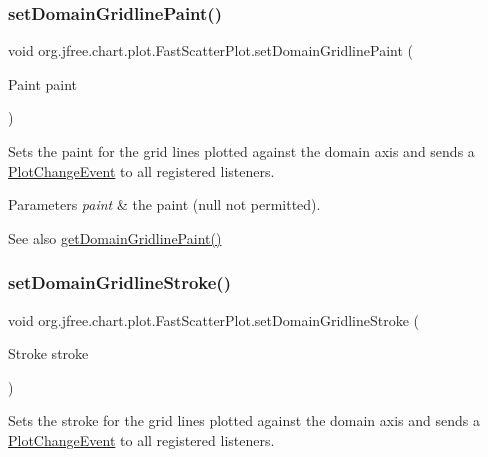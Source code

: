 \subsubsection{\texorpdfstring{set\+Domain\+Gridline\+Paint()}{setDomainGridlinePaint()}}
{\footnotesize\ttfamily void org.\+jfree.\+chart.\+plot.\+Fast\+Scatter\+Plot.\+set\+Domain\+Gridline\+Paint (\begin{DoxyParamCaption}\item[{Paint}]{paint }\end{DoxyParamCaption})}

Sets the paint for the grid lines plotted against the domain axis and sends a \mbox{\hyperlink{}{Plot\+Change\+Event}} to all registered listeners.


\begin{DoxyParams}{Parameters}
{\em paint} & the paint ({\ttfamily null} not permitted).\\
\hline
\end{DoxyParams}
\begin{DoxySeeAlso}{See also}
\mbox{\hyperlink{classorg_1_1jfree_1_1chart_1_1plot_1_1_fast_scatter_plot_a7b1602a024385bab17b05b27b0f55cda}{get\+Domain\+Gridline\+Paint()}} 
\end{DoxySeeAlso}
\mbox{\label{classorg_1_1jfree_1_1chart_1_1plot_1_1_fast_scatter_plot_afdbb5ad6859e7e0319b781713845e104}} 
\subsubsection{\texorpdfstring{set\+Domain\+Gridline\+Stroke()}{setDomainGridlineStroke()}}
{\footnotesize\ttfamily void org.\+jfree.\+chart.\+plot.\+Fast\+Scatter\+Plot.\+set\+Domain\+Gridline\+Stroke (\begin{DoxyParamCaption}\item[{Stroke}]{stroke }\end{DoxyParamCaption})}

Sets the stroke for the grid lines plotted against the domain axis and sends a \mbox{\hyperlink{}{Plot\+Change\+Event}} to all registered listeners.


